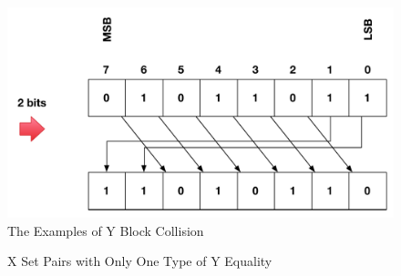 \documentclass{article}
\begin{document}
\begin{figure}
{\begin{minipage}[b]{0.45\textwidth}
\includegraphics[width=1\textwidth]{./diagrams/r_d_2bits.pdf}
\end{minipage}
}
 \caption{The Examples of Y Block Collision}
 \label{fig:2 }
\end{figure}


\begin{figure}
\centering
{}
\caption{X Set Pairs with Only One Type of Y Equality}
 \label{fig:y_e_single} %
\end{figure}
\end{document}
